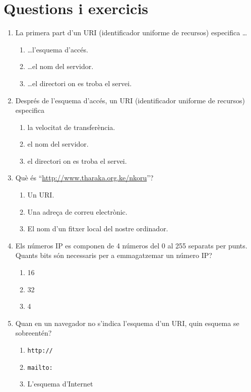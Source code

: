 \section{Questions i exercicis}
\begin{enumerate}

\item La primera part d'un URI (identificador uniforme de recursos)
  especifica \ldots
  \begin{enumerate}
  \item \ldots l'esquema d'accés.
  \item \ldots el nom del servidor.
  \item \ldots el directori on es troba el servei.
  \end{enumerate}

\item Després de l'esquema d'accés, un URI (identificador uniforme de
  recursos) especifica
  \begin{enumerate}
  \item la velocitat de transferència.
  \item el nom del servidor.
  \item el directori on es troba el servei.
  \end{enumerate}

\item Què és ``\url{http://www.tharaka.org.ke/nkoru}''?
  \begin{enumerate}
  \item Un URI.
  \item Una adreça de correu electrònic.
  \item El nom d'un fitxer local del nostre ordinador.
  \end{enumerate}

\item Els números IP es componen de 4 números del 0 al 255 separats
  per punts. Quants bits són necessaris per a emmagatzemar un número
  IP?
  \begin{enumerate}
  \item 16
  \item 32
  \item 4
  \end{enumerate}

\item Quan en un navegador no s'indica l'esquema d'un URI, quin
  esquema se sobreentén?  
  \begin{enumerate}
  \item \texttt{http://}
  \item \texttt{mailto:}
  \item L'esquema d'Internet
  \end{enumerate}


\end{enumerate}
